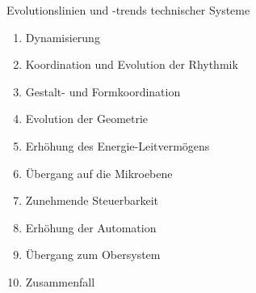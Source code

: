 \documentclass[11pt,a4paper]{article}
\begin{document}
Evolutionslinien und -trends technischer Systeme
\begin{enumerate}\itemsep0pt
\item Dynamisierung
\item Koordination und Evolution der Rhythmik
\item Gestalt- und Formkoordination
\item Evolution der Geometrie
\item Erhöhung des Energie-Leitvermögens
\item Übergang auf die Mikroebene
\item Zunehmende Steuerbarkeit
\item Erhöhung der Automation
\item Übergang zum Obersystem
\item Zusammenfall
\end{enumerate}
\end{document}
